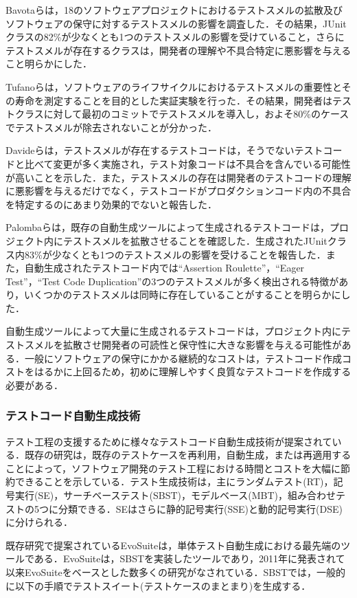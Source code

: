 \documentclass[12pt]{jarticle} %
\begin{document}
\newpage
Bavotaら\cite{Bavota}は，18のソフトウェアプロジェクトにおけるテストスメルの拡散及びソフトウェアの保守に対するテストスメルの影響を調査した．その結果，JUnitクラスの82\%が少なくとも1つのテストスメルの影響を受けていること，さらにテストスメルが存在するクラスは，開発者の理解や不具合特定に悪影響を与えること明らかにした．

Tufanoら\cite{Tufano}は，ソフトウェアのライフサイクルにおけるテストスメルの重要性とその寿命を測定することを目的とした実証実験を行った．その結果，開発者はテストクラスに対して最初のコミットでテストスメルを導入し，およそ80\%のケースでテストスメルが除去されないことが分かった．

Davideら\cite{Davide}は，テストスメルが存在するテストコードは，そうでないテストコードと比べて変更が多く実施され，テスト対象コードは不具合を含んでいる可能性が高いことを示した．また，テストスメルの存在は開発者のテストコードの理解に悪影響を与えるだけでなく，テストコードがプロダクションコード内の不具合を特定するのにあまり効果的でないと報告した．

Palombaら\cite{Fabio2016}は，既存の自動生成ツールによって生成されるテストコードは，プロジェクト内にテストスメルを拡散させることを確認した．生成されたJUnitクラス内83\%が少なくとも1つのテストスメルの影響を受けることを報告した．また，自動生成されたテストコード内では``Assertion Roulette''，``Eager Test''，``Test Code Duplication''の3つのテストスメルが多く検出される特徴があり，いくつかのテストスメルは同時に存在していることがすることを明らかにした．

自動生成ツールによって大量に生成されるテストコードは，プロジェクト内にテストスメルを拡散させ開発者の可読性と保守性に大きな影響を与える可能性がある．一般にソフトウェアの保守にかかる継続的なコストは，テストコード作成コストをはるかに上回るため，初めに理解しやすく良質なテストコードを作成する必要がある．

\subsubsection{テストコード自動生成技術}
テスト工程の支援するために様々なテストコード自動生成技術が提案されている．既存の研究\cite{Machado2010}は，既存のテストケースを再利用，自動生成，または再適用することによって，ソフトウェア開発のテスト工程における時間とコストを大幅に節約できることを示している．テスト生成技術は，主にランダムテスト(RT)，記号実行(SE)，サーチベーステスト(SBST)，モデルベース(MBT)，組み合わせテストの5つに分類できる．SEはさらに静的記号実行(SSE)と動的記号実行(DSE)に分けられる．

既存研究で提案されている{\sf EvoSuite}\cite{EvoSuite}は，単体テスト自動生成における最先端のツールである．{\sf EvoSuite}は，SBSTを実装したツールであり，2011年に発表されて以来{\sf EvoSuite}をベースとした数多くの研究がなされている．SBSTでは，一般的に以下の手順でテストスイート(テストケースのまとまり)を生成する．
\end{document}
